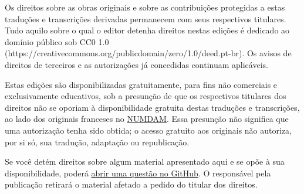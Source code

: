 \documentclass[11pt,twoside,openany]{book}
\newcommand{\FgaUnitKey}{frontmatter}
\begin{document}
Os direitos sobre as obras originais e sobre as contribuições protegidas a estas traduções e transcrições derivadas permanecem com seus respectivos titulares. Tudo aquilo sobre o qual o editor detenha direitos nestas edições é dedicado ao domínio público sob CC0 1.0 (https://creativecommons.org/publicdomain/zero/1.0/deed.pt-br). Os avisos de direitos de terceiros e as autorizações já concedidas continuam aplicáveis.

Estas edições são disponibilizadas gratuitamente, para fins não comerciais e exclusivamente educativos, sob a presunção de que os respectivos titulares dos direitos não se oporiam à disponibilidade gratuita destas traduções e transcrições, ao lado dos originais franceses no \href{https://www.numdam.org/}{NUMDAM}. Essa presunção não significa que uma autorização tenha sido obtida; o acesso gratuito aos originais não autoriza, por si só, sua tradução, adaptação ou republicação.

Se você detém direitos sobre algum material apresentado aqui e se opõe à sua disponibilidade, poderá \href{https://github.com/KokunoYumeto/ega-fga-sga-pt-br/issues}{abrir uma questão no GitHub}. O responsável pela publicação retirará o material afetado a pedido do titular dos direitos.


\tableofcontents
\mainmatter
\def\FgaUnitKey{149}
\def\FgaUnitKey{e149}
\def\FgaUnitKey{182}
\def\FgaUnitKey{e182}
\def\FgaUnitKey{190}
\def\FgaUnitKey{e190}
\def\FgaUnitKey{195}
\def\FgaUnitKey{e195}
\def\FgaUnitKey{212}
\def\FgaUnitKey{e212}
\def\FgaUnitKey{221}
\def\FgaUnitKey{e221}
\def\FgaUnitKey{232}
\def\FgaUnitKey{e232}
\def\FgaUnitKey{236}
\def\FgaUnitKey{e236}
\def\FgaUnitKey{com}
\end{document}
